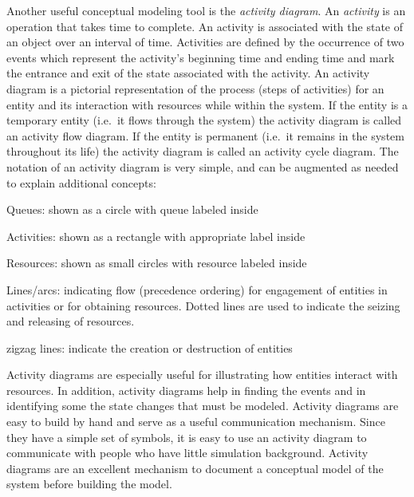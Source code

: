\documentclass[
]{book}
\theoremstyle{definition}
\theoremstyle{definition}
\theoremstyle{definition}
\theoremstyle{definition}
\theoremstyle{remark}
\begin{document}
Another useful conceptual modeling tool is the \emph{activity diagram}. An
\emph{activity} is an operation that takes time to complete. An activity is
associated with the state of an object over an interval of time.
Activities are defined by the occurrence of two events which represent
the activity's beginning time and ending time and mark the entrance and
exit of the state associated with the activity. An activity diagram is a
pictorial representation of the process (steps of activities) for an
entity and its interaction with resources while within the system. If
the entity is a temporary entity (i.e.~it flows through the system) the
activity diagram is called an activity flow diagram. If the entity is
permanent (i.e.~it remains in the system throughout its life) the
activity diagram is called an activity cycle diagram. The notation of an
activity diagram is very simple, and can be augmented as needed to
explain additional concepts:

Queues: shown as a circle with queue labeled inside

Activities: shown as a rectangle with appropriate label inside

Resources: shown as small circles with resource labeled inside

Lines/arcs: indicating flow (precedence ordering) for engagement of entities in
activities or for obtaining resources. Dotted lines are used to
indicate the seizing and releasing of resources.

zigzag lines: indicate the creation or destruction of entities

Activity diagrams are especially useful for illustrating how entities
interact with resources. In addition, activity diagrams help in finding
the events and in identifying some the state changes that must be
modeled. Activity diagrams are easy to build by hand and serve as a
useful communication mechanism. Since they have a simple set of symbols,
it is easy to use an activity diagram to communicate with people who
have little simulation background. Activity diagrams are an excellent
mechanism to document a conceptual model of the system before building
the model.
\end{document}
